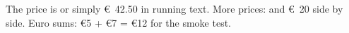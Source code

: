 \documentclass{article}
\begin{document}
The price is  or simply \euro{}~42.50 in running text.
More prices:  and \euro{}~20 side by side.
Euro sums: \euro 5 + \euro 7 = \euro 12 for the smoke test.
\end{document}
